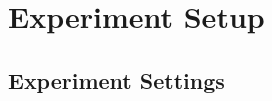 




    
    








\section{Experiment Setup}
\label{sec:experiment-setup}

\subsection{Experiment Settings}
